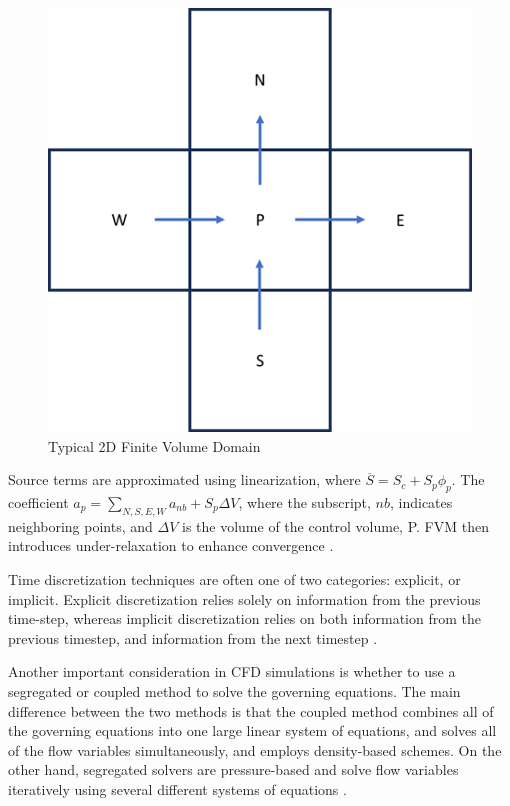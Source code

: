 \documentclass{UCF_ETD}
\begin{document}
\begin{figure}
    \centering
    \includegraphics{Figures/FVMgrid.png}
    \caption{Typical 2D Finite Volume Domain}
    \label{fig:FVMgrid}
\end{figure}

Source terms are approximated using linearization, where $\overline{S}=S_c+S_p\phi_p$. The coefficient $a_p=\sum_{N,S,E,W}{a_{nb}+S_p\Delta V}$, where the subscript, $nb$, indicates neighboring points, and $\Delta V$ is the volume of the control volume, P. FVM then introduces under-relaxation to enhance convergence \cite{SIMPLEC}.

Time discretization techniques are often one of two categories: explicit, or implicit. Explicit discretization relies solely on information from the previous time-step, whereas implicit discretization relies on both information from the previous timestep, and information from the next timestep \cite{Anderson1995}.

Another important consideration in CFD simulations is whether to use a segregated or coupled method to solve the governing equations. The main difference between the two methods is that the coupled method combines all of the governing equations into one large linear system of equations, and solves all of the flow variables simultaneously, and employs density-based schemes. On the other hand, segregated solvers are pressure-based and solve flow variables iteratively using several different systems of equations \cite{ransom_1996}.
\end{document}
